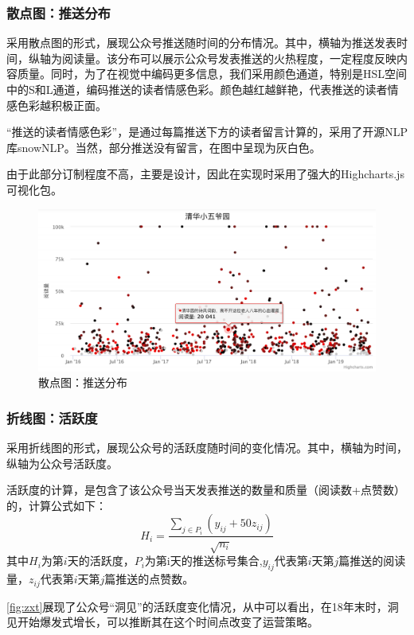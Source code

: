 \documentclass[a4paper,12pt]{article}
\begin{document}
    \subsubsection{散点图：推送分布}
    采用散点图的形式，展现公众号推送随时间的分布情况。其中，横轴为推送发表时间，纵轴为阅读量。该分布可以展示公众号发表推送的火热程度，一定程度反映内容质量。同时，为了在视觉中编码更多信息，我们采用颜色通道，特别是HSL空间中的S和L通道，编码推送的读者情感色彩。颜色越红越鲜艳，代表推送的读者情感色彩越积极正面。

    “推送的读者情感色彩”，是通过每篇推送下方的读者留言计算的，采用了开源NLP库snowNLP。当然，部分推送没有留言，在图中呈现为灰白色。

    由于此部分订制程度不高，主要是设计，因此在实现时采用了强大的Highcharts.js可视化包。
    \begin{figure}
      \centering
      \includegraphics[width=0.95\linewidth]{sdt.png}
      \caption{散点图：推送分布}
      \label{fig:sdt}
    \end{figure}
    \subsubsection{折线图：活跃度}
    采用折线图的形式，展现公众号的活跃度随时间的变化情况。其中，横轴为时间，纵轴为公众号活跃度。

    活跃度的计算，是包含了该公众号当天发表推送的数量和质量（阅读数+点赞数）的，计算公式如下：
    \[
      H_i = \frac{\sum_{j\in{P_i}}(y_{ij}+50z_{ij})}{\sqrt{n_i}}
    \]
    其中$H_i$为第$i$天的活跃度，$P_i$为第i天的推送标号集合,$y_{ij}$代表第$i$天第$j$篇推送的阅读量，$z_{ij}$代表第$i$天第$j$篇推送的点赞数。

    \cref{fig:zxt}展现了公众号“洞见”的活跃度变化情况，从中可以看出，在18年末时，洞见开始爆发式增长，可以推断其在这个时间点改变了运营策略。
\end{document}
